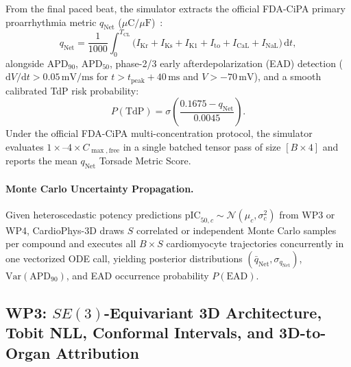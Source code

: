 \documentclass[10pt,twocolumn,letterpaper]{article}
\newcommand{\qnet}{q_{\mathrm{Net}}}
\newcommand{\cmax}{C_{\max,\mathrm{free}}}
\newcommand{\apd}{\mathrm{APD}_{90}}
\begin{document}
From the final paced beat, the simulator extracts the official FDA-CiPA primary proarrhythmia metric $\qnet$ ($\mu\mathrm{C}/\mu\mathrm{F}$)~\cite{dutta2017optimization}:
\begin{equation}
  \qnet = \frac{1}{1000}\int_{0}^{T_{\mathrm{CL}}} \bigl(I_{\mathrm{Kr}} + I_{\mathrm{Ks}} + I_{\mathrm{K1}} + I_{\mathrm{to}} + I_{\mathrm{CaL}} + I_{\mathrm{NaL}}\bigr)\,\mathrm{d}t,
  \label{eq:qnet}
\end{equation}
alongside $\apd$, $\mathrm{APD}_{50}$, phase-2/3 early afterdepolarization (EAD) detection ($\mathrm{d}V/\mathrm{d}t > 0.05\,\mathrm{mV/ms}$ for $t > t_{\mathrm{peak}} + 40\,\mathrm{ms}$ and $V > -70\,\mathrm{mV}$), and a smooth calibrated TdP risk probability:
\begin{equation}
  P(\mathrm{TdP}) = \sigma\!\left(\frac{0.1675 - \qnet}{0.0045}\right).
  \label{eq:tdp_prob}
\end{equation}
Under the official FDA-CiPA multi-concentration protocol, the simulator evaluates $1\times$--$4\times\cmax$ in a single batched tensor pass of size $[B \times 4]$ and reports the mean $\qnet$ Torsade Metric Score.

\paragraph{Monte Carlo Uncertainty Propagation.}
Given heteroscedastic potency predictions $\mathrm{pIC}_{50,c} \sim \mathcal{N}(\mu_c, \sigma_c^2)$ from WP3 or WP4, CardioPhys-3D draws $S$ correlated or independent Monte Carlo samples per compound and executes all $B \times S$ cardiomyocyte trajectories concurrently in one vectorized ODE call, yielding posterior distributions $(\bar{q}_{\mathrm{Net}}, \sigma_{\qnet})$, $\mathrm{Var}(\apd)$, and EAD occurrence probability $P(\mathrm{EAD})$.

\subsection{WP3: $SE(3)$-Equivariant 3D Architecture, Tobit NLL, Conformal Intervals, and 3D-to-Organ Attribution}
\label{sec:wp3}
\end{document}
